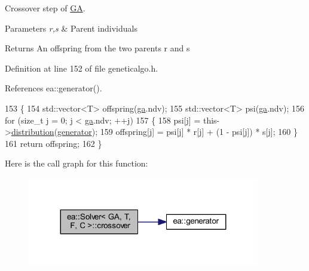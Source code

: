 Crossover step of \hyperlink{structea_1_1_g_a}{GA}. 


\begin{DoxyParams}{Parameters}
{\em r,s} & Parent individuals \\
\hline
\end{DoxyParams}
\begin{DoxyReturn}{Returns}
An offspring from the two parents r and s 
\end{DoxyReturn}


Definition at line 152 of file geneticalgo.\+h.



References ea\+::generator().


\begin{DoxyCode}
153     \{
154         std::vector<T> offspring(\hyperlink{classea_1_1_solver_3_01_g_a_00_01_t_00_01_f_00_01_c_01_4_a5e56c4d15894af96c2be5fcaec7d14fb}{ga}.ndv);
155         std::vector<T> psi(\hyperlink{classea_1_1_solver_3_01_g_a_00_01_t_00_01_f_00_01_c_01_4_a5e56c4d15894af96c2be5fcaec7d14fb}{ga}.ndv);
156         \textcolor{keywordflow}{for} (\textcolor{keywordtype}{size\_t} j = 0; j < \hyperlink{classea_1_1_solver_3_01_g_a_00_01_t_00_01_f_00_01_c_01_4_a5e56c4d15894af96c2be5fcaec7d14fb}{ga}.ndv; ++j)
157         \{
158             psi[j] = this->\hyperlink{classea_1_1_solver__base_ae88f44b13e264e092d3bbaeca6b3bd19}{distribution}(\hyperlink{namespaceea_a385e8ca8ba4ae2f69dcfffa79f20c2ff}{generator});
159             offspring[j] = psi[j] * r[j] + (1 - psi[j]) * s[j];
160         \}
161         \textcolor{keywordflow}{return} offspring;
162     \}
\end{DoxyCode}
Here is the call graph for this function\+:
\nopagebreak
\begin{figure}[H]
\begin{center}
\leavevmode
\includegraphics[width=287pt]{classea_1_1_solver_3_01_g_a_00_01_t_00_01_f_00_01_c_01_4_ad197350b0ef8bc73293fe31978702f02_cgraph}
\end{center}
\end{figure}
\mbox{\label{classea_1_1_solver_3_01_g_a_00_01_t_00_01_f_00_01_c_01_4_a36b4364bdb9a079aa327d6664d538167}} 
